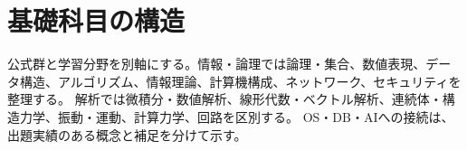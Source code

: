 \chapter{基礎科目の構造}
公式群と学習分野を別軸にする。情報・論理では論理・集合、数値表現、データ構造、アルゴリズム、情報理論、計算機構成、ネットワーク、セキュリティを整理する。
解析では微積分・数値解析、線形代数・ベクトル解析、連続体・構造力学、振動・運動、計算力学、回路を区別する。
OS・DB・AIへの接続は、出題実績のある概念と補足を分けて示す。
